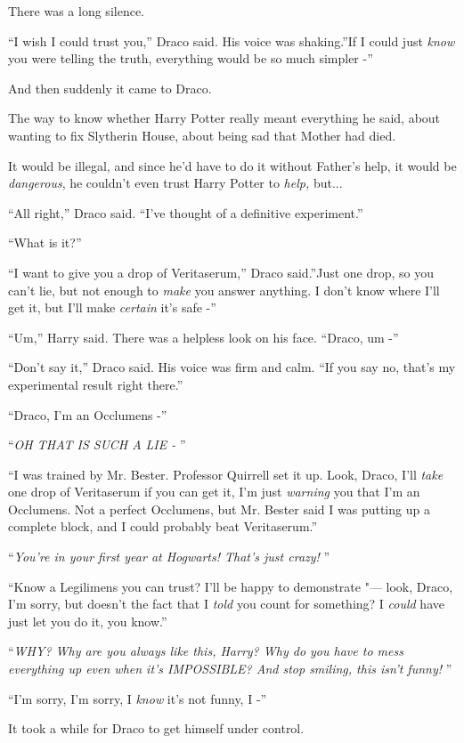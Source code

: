 There was a long silence.

``I wish I could trust you,'' Draco said. His voice was shaking.''If I
could just \emph{know} you were telling the truth, everything would be
so much simpler -''

And then suddenly it came to Draco.

The way to know whether Harry Potter really meant everything he said,
about wanting to fix Slytherin House, about being sad that Mother had
died.

It would be illegal, and since he'd have to do it without Father's help,
it would be \emph{dangerous}, he couldn't even trust Harry Potter to
\emph{help,} but...

``All right,'' Draco said. ``I've thought of a definitive experiment.''

``What is it?''

``I want to give you a drop of Veritaserum,'' Draco said.''Just one
drop, so you can't lie, but not enough to \emph{make} you answer
anything. I don't know where I'll get it, but I'll make \emph{certain}
it's safe -''

``Um,'' Harry said. There was a helpless look on his face. ``Draco, um
-''

``Don't say it,'' Draco said. His voice was firm and calm. ``If you say
no, that's my experimental result right there.''

``Draco, I'm an Occlumens -''

``\emph{OH THAT IS SUCH A LIE -} ''

``I was trained by Mr. Bester. Professor Quirrell set it up. Look, Draco,
I'll \emph{take} one drop of Veritaserum if you can get it, I'm just
\emph{warning} you that I'm an Occlumens. Not a perfect Occlumens, but
Mr. Bester said I was putting up a complete block, and I could probably
beat Veritaserum.''

``\emph{You're in your first year at Hogwarts! That's just crazy!} ''

``Know a Legilimens you can trust? I'll be happy to demonstrate "--- look,
Draco, I'm sorry, but doesn't the fact that I \emph{told} you count for
something? I \emph{could} have just let you do it, you know.''

``\emph{WHY? Why are you always like this, Harry? Why do you have to mess
everything up even when it's IMPOSSIBLE? And stop smiling, this isn't
funny!} ''

``I'm sorry, I'm sorry, I \emph{know} it's not funny, I -''

It took a while for Draco to get himself under control.

